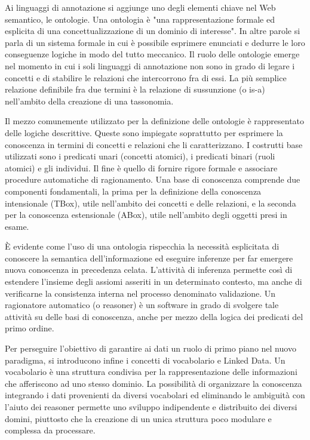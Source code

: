 \documentclass[Lau,binding=0.6cm,noexaminfo,oneside]{sapthesis}
\begin{document}
Ai linguaggi di annotazione si aggiunge uno degli elementi chiave nel Web semantico, le ontologie. Una ontologia è "una rappresentazione formale ed esplicita di una concettualizzazione di un dominio di interesse". In altre parole si parla di un sistema formale in cui è possibile esprimere enunciati e dedurre le loro conseguenze logiche in modo del tutto meccanico.
Il ruolo delle ontologie emerge nel momento in cui i soli linguaggi di annotazione non sono in grado di legare i concetti e di stabilire le relazioni che intercorrono fra di essi. La più semplice relazione definibile fra due termini è la relazione di sussunzione (o is-a) nell'ambito della creazione di una tassonomia.\medskip

Il mezzo comunemente utilizzato per la definizione delle ontologie è rappresentato delle logiche descrittive. Queste sono impiegate soprattutto per esprimere la conoscenza in termini di concetti e relazioni che li caratterizzano. I costrutti base utilizzati sono i predicati unari (concetti atomici), i predicati binari (ruoli atomici) e gli individui.
Il fine è quello di fornire rigore formale e associare procedure automatiche di ragionamento. Una base di conoscenza comprende due componenti fondamentali, la prima per la definizione della conoscenza intensionale (TBox), utile nell'ambito dei concetti e delle relazioni, e la seconda per la conoscenza estensionale (ABox), utile nell'ambito degli oggetti presi in esame.\medskip

\MakeUppercase{è} evidente come l'uso di una ontologia rispecchia la necessità esplicitata di conoscere la semantica dell'informazione ed eseguire inferenze per far emergere nuova conoscenza in precedenza celata.
L'attività di inferenza permette così di estendere l'insieme degli assiomi asseriti in un determinato contesto, ma anche di verificarne la consistenza interna nel processo denominato validazione. Un ragionatore automatico (o reasoner) è un software in grado di svolgere tale attività su delle basi di conoscenza, anche per mezzo della logica dei predicati del primo ordine.\medskip

Per perseguire l'obiettivo di garantire ai dati un ruolo di primo piano nel nuovo paradigma, si introducono infine i concetti di vocabolario e Linked Data. Un vocabolario è una struttura condivisa per la rappresentazione delle informazioni che afferiscono ad uno stesso dominio.
La possibilità di organizzare la conoscenza integrando i dati provenienti da diversi vocabolari ed eliminando le ambiguità con l'aiuto dei reasoner permette uno sviluppo indipendente e distribuito dei diversi domini, piuttosto che la creazione di un unica struttura poco modulare e complessa da processare.\medskip
\end{document}
